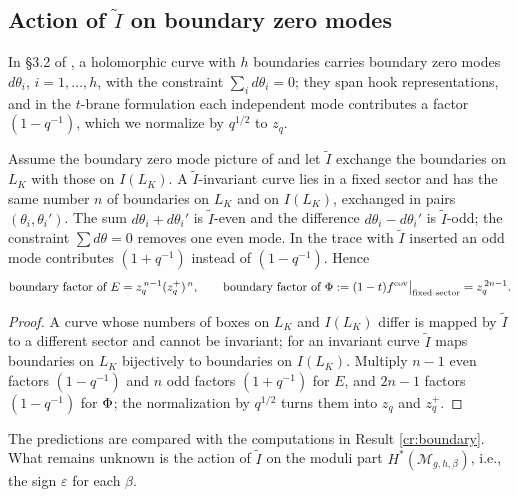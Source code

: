 \subsection{Action of $\tilde I$ on boundary zero modes}\label{sec:boundary}
In \S3.2 of \cite{KN17}, a holomorphic curve with $h$ boundaries carries boundary zero modes $d\theta_i$, $i = 1, \dots, h$, with the constraint $\sum_i d\theta_i = 0$; they span hook representations, and in the $t$-brane formulation each independent mode contributes a factor $(1 - q^{-1})$, which we normalize by $q^{1/2}$ to $z_q$.
\begin{proposition}\label{prop:boundary}
Assume the boundary zero mode picture of \cite{KN17} and let $\tilde I$ exchange the boundaries on $L_K$ with those on $I(L_K)$. A $\tilde I$-invariant curve lies in a fixed sector and has the same number $n$ of boundaries on $L_K$ and on $I(L_K)$, exchanged in pairs $(\theta_i, \theta_i')$. The sum $d\theta_i + d\theta_i'$ is $\tilde I$-even and the difference $d\theta_i - d\theta_i'$ is $\tilde I$-odd; the constraint $\sum d\theta = 0$ removes one even mode. In the trace with $\tilde I$ inserted an odd mode contributes $(1 + q^{-1})$ instead of $(1 - q^{-1})$. Hence
\begin{equation}\label{eq:boundary}
\text{boundary factor of } E = z_q^{\,n-1}(z_q^+)^{\,n},\qquad
\text{boundary factor of } \Phi := (1-t)f^{\mathrm{cov}}\big|_{\text{fixed sector}} = z_q^{\,2n-1}.
\end{equation}
\end{proposition}
\begin{proof}
A curve whose numbers of boxes on $L_K$ and $I(L_K)$ differ is mapped by $\tilde I$ to a different sector and cannot be invariant; for an invariant curve $\tilde I$ maps boundaries on $L_K$ bijectively to boundaries on $I(L_K)$. Multiply $n-1$ even factors $(1 - q^{-1})$ and $n$ odd factors $(1 + q^{-1})$ for $E$, and $2n - 1$ factors $(1 - q^{-1})$ for $\Phi$; the normalization by $q^{1/2}$ turns them into $z_q$ and $z_q^+$.
\end{proof}
The predictions are compared with the computations in Result \ref{cr:boundary}. What remains unknown is the action of $\tilde I$ on the moduli part $H^*(\mathcal{M}_{g,h,\beta})$, i.e., the sign $\varepsilon$ for each $\beta$.


